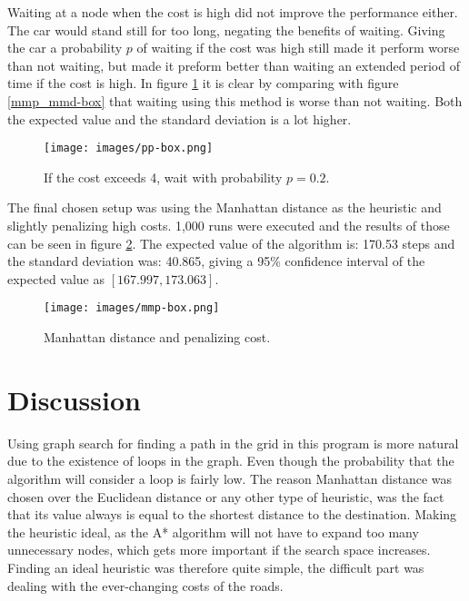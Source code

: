 \documentclass[12pt, a4paper]{article}
\begin{document}
Waiting at a node when the cost is high did not improve the performance either. The car would stand still for too long, negating the benefits of waiting. Giving the car a probability $p$ of waiting if the cost was high still made it perform worse than not waiting, but made it preform better than waiting an extended period of time if the cost is high. In figure \ref{pp-box} it is clear by comparing with figure \ref{mmp_mmd-box} that waiting using this method is worse than not waiting. Both the expected value and the standard deviation is a lot higher.

\begin{figure}[!ht]
\centering
\texttt{[image: images/pp-box.png]}\\
\caption{If the cost exceeds 4, wait with probability $p=0.2$.}
\label{pp-box}
\end{figure}
\vspace{2.5mm}

The final chosen setup was using the Manhattan distance as the heuristic and slightly penalizing high costs. 1,000 runs were executed and the results of those can be seen in figure \ref{mmp-box}. The expected value of the algorithm is: 170.53 steps and the standard deviation was: 40.865, giving a 95\% confidence interval of the expected value as $[167.997, 173.063]$.


\begin{figure}[!ht]
\centering
\texttt{[image: images/mmp-box.png]}\\
\caption{Manhattan distance and penalizing cost.}
\label{mmp-box}
\end{figure}
\vspace{2.5mm}


\section{Discussion}
Using graph search for finding a path in the grid in this program is more natural due to the existence of loops in the graph. Even though the probability that the algorithm will consider a loop is fairly low. The reason Manhattan distance was chosen over the Euclidean distance or any other type of heuristic, was the fact that its value always is equal to the shortest distance to the destination. Making the heuristic ideal, as the A* algorithm will not have to expand too many unnecessary nodes, which gets more important if the search space increases. Finding an ideal heuristic was therefore quite simple, the difficult part was dealing with the ever-changing costs of the roads.
\end{document}
